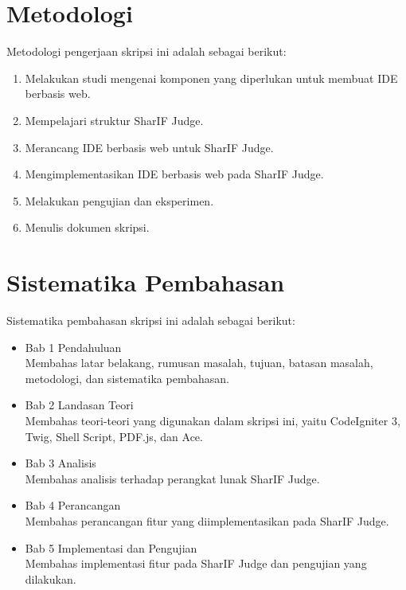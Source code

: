 \section{Metodologi}
\label{sec:metlit}
Metodologi pengerjaan skripsi ini adalah sebagai berikut:
\begin{enumerate}
	\item Melakukan studi mengenai komponen yang diperlukan untuk membuat IDE berbasis web.
	\item Mempelajari struktur SharIF Judge.
	\item Merancang IDE berbasis web untuk SharIF Judge.
	\item Mengimplementasikan IDE berbasis web pada SharIF Judge.
	\item Melakukan pengujian dan eksperimen.
	\item Menulis dokumen skripsi.
\end{enumerate}

\section{Sistematika Pembahasan}
\label{sec:sispem}
Sistematika pembahasan skripsi ini adalah sebagai berikut:
\begin{itemize}
	\item Bab 1 Pendahuluan \\ Membahas latar belakang, rumusan masalah, tujuan, batasan masalah, metodologi, dan sistematika pembahasan.
	\item Bab 2 Landasan Teori \\ Membahas teori-teori yang digunakan dalam skripsi ini, yaitu CodeIgniter 3, Twig, Shell Script, PDF.js, dan Ace.
	\item Bab 3 Analisis \\ Membahas analisis terhadap perangkat lunak SharIF Judge.
	\item Bab 4 Perancangan \\ Membahas perancangan fitur yang diimplementasikan pada SharIF Judge.
	\item Bab 5 Implementasi dan Pengujian \\ Membahas implementasi fitur pada SharIF Judge dan pengujian yang dilakukan.
\end{itemize}
